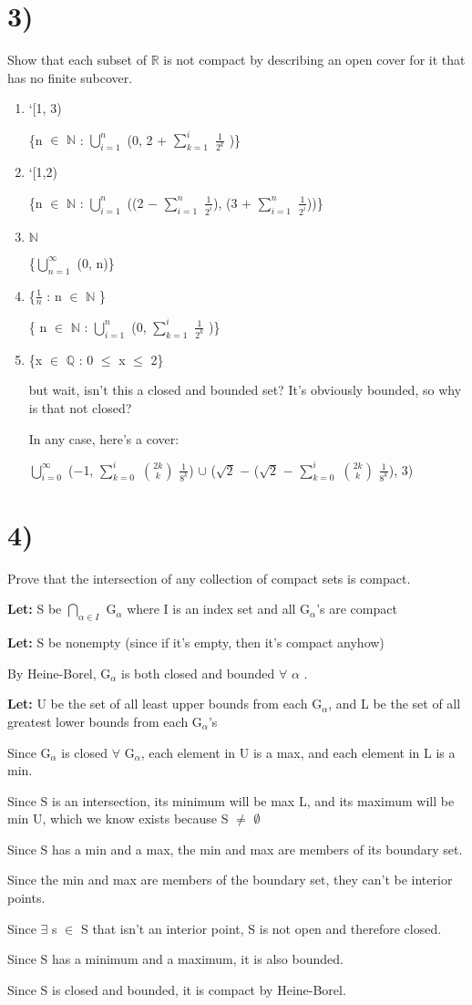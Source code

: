 \documentclass{article}
\newcommand{\mt}[1]{\ensuremath{#1}}
\newcommand\bsc[2][\DefaultOpt]{%
  \def\DefaultOpt{#2}%
  \section[#1]{#2}%
}
\newcommand{\balist}{\begin{enumerate}[label=\alph*.]}
\newcommand{\elist}{\end{enumerate}}
\newcommand{\lt}[1]{\textbf{Let: } #1}
\newcommand{\br}{\mt{\mathbb{R}} }       %
\newcommand{\bq}{\mt{\mathbb{Q}} }       %
\newcommand{\bn}{\mt{\mathbb{N}} }       %
\newcommand{\fa}{\mt{\forall} }          %
\newcommand{\afa}{\mt{\alpha} }
\newcommand{\mem}{\mt{\in} }
\newcommand{\exs}{\mt{\exists} }
\newcommand{\es}{\mt{\emptyset} }        %
\newcommand{\uw}[2]{#1\mt{_{#2}}}
\newcommand{\frc}[2]{\mt{\frac{#1}{#2}}}
\newcommand{\urng}[2]{\mt{\bigcup_{#1}^{#2}}}
\newcommand{\nrng}[2]{\mt{\bigcap_{#1}^{#2}}}
\newcommand{\nck}[2]{\mt{{#1 \choose #2}}}
\begin{document}
\bsc{3)}{
Show that each subset of \br is not compact by describing an open cover for it that has no finite subcover.

\balist
\item `[1, 3) 
	
	\{n \mem \bn : \urng{i = 1}{n} (0, 2 + $\sum_{k = 1}^i$ \frc{1}{2^k} )\}
\item `[1,2)
	
	\{n \mem \bn : \urng{i = 1}{n} ((2 $-$ $\sum_{i = 1}^n$ \frc{1}{2^i}), (3 $+$ $\sum_{i = 1}^n$ \frc{1}{2^i}))\}
\item \bn
	
	\{\urng{n = 1}{\infty} (0, n)\}
\item \{\frc{1}{n} : n \mem \bn\}
	
	\{ n \mem \bn: \urng{i = 1}{n} (0, $\sum_{k = 1}^i$ \frc{1}{2^k} )\}
\item \{x \mem \bq : 0 $\leq$ x $\leq$ 2\} 
	
	but wait, isn't this a closed and bounded set? It's obviously bounded, so why is that not closed?
	
	In any case, here's a cover:
	
	\urng{i = 0}{\infty} ($-$1, $\sum_{k = 0}^i$ \nck{2k}{k} $\frac{1}{8^k}$) $\cup$ ($\sqrt{2}$ $-$ ($\sqrt{2}$ $-$ $\sum_{k = 0}^i$ \nck{2k}{k} $\frac{1}{8^k}$), 3)
	
\elist

}

\bsc{4)}{
Prove that the intersection of any collection of compact sets is compact.

\lt{S be \nrng{\afa \mem I}{} \uw{G}{\afa} where I is an index set and all \uw{G}{\afa}'s are compact}

\lt{S be nonempty (since if it's empty, then it's compact anyhow)}


By Heine-Borel, \uw{G}{\afa} is both closed and bounded \fa \afa.

\lt{U be the set of all least upper bounds from each \uw{G}{\afa}, and L be the set of all greatest lower bounds from each \uw{G}{\afa}'s}

Since \uw{G}{\afa} is closed \fa \uw{G}{\afa}, each element in U is a max, and each element in L is a min.

Since S is an intersection, its minimum will be max L, and its maximum will be min U, which we know exists because S $\neq$ \es

Since S has a min and a max, the min and max are members of its boundary set.

Since the min and max are members of the boundary set, they can't be interior points.

Since \exs s \mem S that isn't an interior point, S is not open and therefore closed.

Since S has a minimum and a maximum, it is also bounded.

Since S is closed and bounded, it is compact by Heine-Borel.
}
\end{document}
